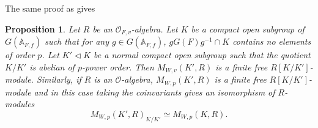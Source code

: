 \documentclass[12pt,oneside,reqno]{amsart}
\newcommand{\A}{\mathbb{A}}
\theoremstyle{plain}
\newtheorem{proposition}[theorem]{Proposition}
\begin{document}
	
	
	
	
	
	
	
	The same proof as \cite[Lemma 6.4]{Thorne2012} gives
	\begin{proposition}\label{compare invariants of different cpt open subgroups}
		Let $R$ be an $\mathcal{O}_{F,v}$-algebra.
		Let $K$ be a compact open subgroup of $G(\A_{F,f})$ such that for any $g\in G(\A_{F,f})$, $gG(F)g^{-1}\cap K$ contains no elements of order $p$.
		Let $K'\vartriangleleft K$ be a normal compact open subgroup such that the quotient $K/K'$ is abelian of $p$-power order. Then $M_{W,v}(K',R)$
		is a finite free $R[K/K']$-module. Similarly, if $R$ is an $\mathcal{O}$-algebra, $M_{W,p}(K',R)$ is a finite free	$R[K/K']$-module
		and in this case taking the coinvariants gives an isomorphism of
		$R$-modules
		\[
		M_{W,p}(K',R)_{K/K'}
		\simeq
		M_{W,p}(K,R).
		\]
	\end{proposition}
	
	
	
	
	
	
	
	
	
	
	
	
	
	
	
\end{document}
